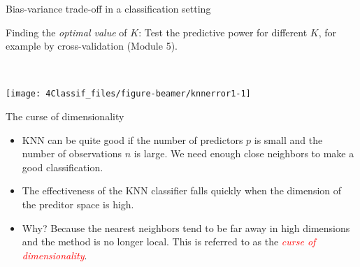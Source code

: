 \documentclass[
  10pt,
  ignorenonframetext,
]{beamer}
\providecommand{\tightlist}{%
  \setlength{\itemsep}{0pt}\setlength{\parskip}{0pt}}
\begin{document}
\begin{frame}
\begin{block}{Bias-variance trade-off in a classification setting}
\protect\hypertarget{bias-variance-trade-off-in-a-classification-setting}{}
\(~\)

Finding the \emph{optimal value} of \(K\): Test the predictive power for
different \(K\), for example by cross-validation (Module 5).

\(~\)

\begin{center}\texttt{[image: 4Classif\_files/figure-beamer/knnerror1-1]} \end{center}

\vspace{2mm}
\end{block}
\end{frame}

\begin{frame}
\begin{block}{The curse of dimensionality}
\protect\hypertarget{the-curse-of-dimensionality}{}
\vspace{2mm}

\begin{itemize}
\tightlist
\item
  KNN can be quite good if the number of predictors \(p\) is small and
  the number of observations \(n\) is large. We need enough close
  neighbors to make a good classification.
\end{itemize}

\vspace{2mm}

\begin{itemize}
\tightlist
\item
  The effectiveness of the KNN classifier falls quickly when the
  dimension of the preditor space is high.
\end{itemize}

\vspace{2mm}

\begin{itemize}
\tightlist
\item
  Why? Because the nearest neighbors tend to be far away in high
  dimensions and the method is no longer local. This is referred to as
  the \emph{\textcolor{red}{curse of dimensionality}}.
\end{itemize}
\end{block}
\end{frame}
\end{document}
